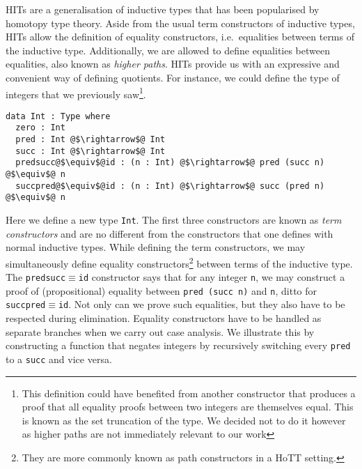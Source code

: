 \documentclass[12pt,twoside,maitrise]{dms}
\theoremstyle{definition}
\numberwithin{equation}{section}
\numberwithin{table}{chapter}
\numberwithin{figure}{chapter}
\newcommand\id[1] {\texttt{#1}}
\newcommand\fn[1] {\texttt{#1}}
\begin{document}


HITs are a generalisation of inductive types that has been popularised by
homotopy type theory\cite{HoTTbook}. Aside from the usual term constructors of
inductive types, HITs allow the definition of equality constructors,
i.e.\ equalities between terms of the inductive type. Additionally, we are
allowed to define equalities between equalities, also known as \emph{higher
paths}. HITs provide us with an expressive and convenient way of defining
quotients. For instance, we could define the type of integers that we previously
saw\footnote{This definition could have benefited from another constructor that
produces a proof that all equality proofs between two integers are themselves
equal. This is known as the set truncation of the type. We decided not to do it
however as higher paths are not immediately relevant to our work}.

\begin{verbatim}
data Int : Type where
  zero : Int
  pred : Int @$\rightarrow$@ Int
  succ : Int @$\rightarrow$@ Int
  predsucc@$\equiv$@id : (n : Int) @$\rightarrow$@ pred (succ n) @$\equiv$@ n
  succpred@$\equiv$@id : (n : Int) @$\rightarrow$@ succ (pred n) @$\equiv$@ n
\end{verbatim}

Here we define a new type \id{Int}. The first three constructors are known as
\emph{term constructors} and are no different from the constructors that one
defines with normal inductive types. While defining the term constructors, we
may simultaneously define equality constructors\footnote{They are more commonly
known as path constructors in a HoTT setting.} between terms of the inductive
type. The \id{predsucc$\equiv$id} constructor says that for any integer \id{n},
we may construct a proof of (propositional) equality between \fn{pred (succ n)}
and \id{n}, ditto for \id{succpred$\equiv$id}. Not only can we prove such
equalities, but they also have to be respected during elimination. Equality
constructors have to be handled as separate branches when we carry out case
analysis. We illustrate this by constructing a function that negates integers by
recursively switching every \id{pred} to a \id{succ} and vice versa.
\end{document}
